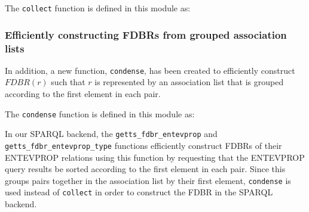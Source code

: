 \documentclass[../main.tex]{subfiles}
\begin{document}
The \texttt{collect} function is defined in this module as:







\subsubsection{Efficiently constructing FDBRs from grouped association lists}
In addition, a new function, \texttt{condense}, has been created to efficiently construct $FDBR(r)$ such that $r$ is represented by an association list that is grouped according to the first element in each pair.

The \texttt{condense} function is defined in this module as:


In our SPARQL backend, the \texttt{getts\_fdbr\_entevprop} and \texttt{getts\_fdbr\_entevprop\_type} functions efficiently construct FDBRs of their ENTEVPROP relations using this function by requesting that the ENTEVPROP query results be sorted according to the first element in each pair.  Since this groups pairs together in the association list by their first element, \texttt{condense} is used instead of \texttt{collect} in order to construct the FDBR in the SPARQL backend.
\end{document}
